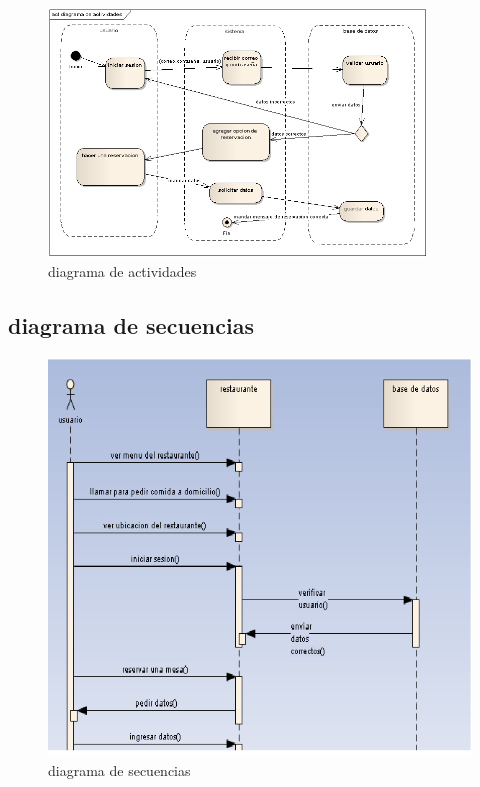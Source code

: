 \begin{figure}[H]
\caption{diagrama de actividades}
\centering
\includegraphics[width=10cm]{imagenes/actividades}

\end{figure}


\subsection{diagrama de secuencias}

\begin{figure}[H]
\caption{diagrama de secuencias}
\centering
\includegraphics[scale=0.80]{imagenes/secuencias}

\end{figure}




